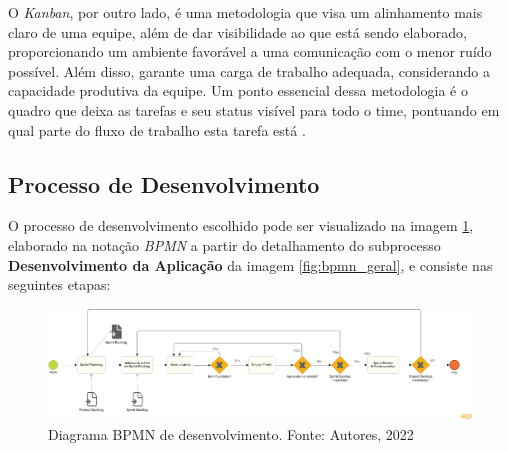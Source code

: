 O \textit{Kanban}, por outro lado, é uma metodologia que visa um alinhamento mais claro de uma equipe, além de dar visibilidade ao que está sendo elaborado, proporcionando um ambiente favorável a uma comunicação com o menor ruído possível. Além disso, garante uma carga de trabalho adequada, considerando a capacidade produtiva da equipe. Um ponto essencial dessa metodologia é o quadro que deixa as tarefas e seu status visível para todo o time, pontuando em qual parte do fluxo de trabalho esta tarefa está \cite{K_Condensed}.

\subsection{Processo de Desenvolvimento}

\label{sec:met_dev}

O processo de desenvolvimento escolhido pode ser visualizado na imagem \ref{fig:bpmn_dev}, elaborado na notação \textit{BPMN} a partir do detalhamento do subprocesso \textbf{Desenvolvimento da Aplicação} da imagem \ref{fig:bpmn_geral}, e consiste nas seguintes etapas:

\begin{figure}[H]
    \begin{center}
        \includegraphics[scale=0.23]{figuras/Metodologia/bpmn_dev.png}
        \caption{{Diagrama BPMN de desenvolvimento. Fonte: Autores, 2022}}
        \label{fig:bpmn_dev}
    \end{center}
\end{figure}

